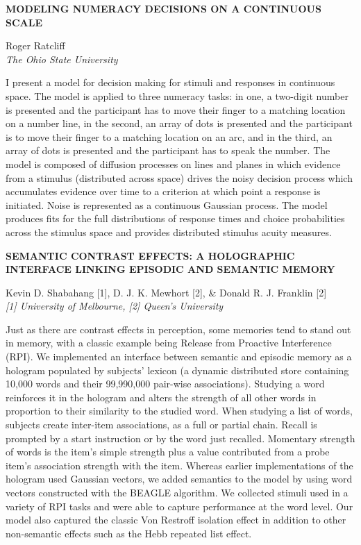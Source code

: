 \documentclass[]{article}
\begin{document}
\textbf{MODELING NUMERACY DECISIONS ON A CONTINUOUS SCALE}

Roger Ratcliff\\
\emph{The Ohio State University}

I present a model for decision making for stimuli and responses in
continuous space. The model is applied to three numeracy tasks: in one,
a two-digit number is presented and the participant has to move their
finger to a matching location on a number line, in the second, an array
of dots is presented and the participant is to move their finger to a
matching location on an arc, and in the third, an array of dots is
presented and the participant has to speak the number. The model is
composed of diffusion processes on lines and planes in which evidence
from a stimulus (distributed across space) drives the noisy decision
process which accumulates evidence over time to a criterion at which
point a response is initiated. Noise is represented as a continuous
Gaussian process. The model produces fits for the full distributions of
response times and choice probabilities across the stimulus space and
provides distributed stimulus acuity measures.\\
\pagebreak  

\textbf{SEMANTIC CONTRAST EFFECTS: A HOLOGRAPHIC INTERFACE LINKING
EPISODIC AND SEMANTIC MEMORY}

Kevin D. Shabahang {[}1{]}, D. J. K. Mewhort {[}2{]}, \& Donald R. J.
Franklin {[}2{]}\\
\emph{{[}1{]} University of Melbourne, {[}2{]} Queen's University}

Just as there are contrast effects in perception, some memories tend to
stand out in memory, with a classic example being Release from Proactive
Interference (RPI). We implemented an interface between semantic and
episodic memory as a hologram populated by subjects' lexicon (a dynamic
distributed store containing 10,000 words and their 99,990,000 pair-wise
associations). Studying a word reinforces it in the hologram and alters
the strength of all other words in proportion to their similarity to the
studied word. When studying a list of words, subjects create inter-item
associations, as a full or partial chain. Recall is prompted by a start
instruction or by the word just recalled. Momentary strength of words is
the item's simple strength plus a value contributed from a probe item's
association strength with the item. Whereas earlier implementations of
the hologram used Gaussian vectors, we added semantics to the model by
using word vectors constructed with the BEAGLE algorithm. We collected
stimuli used in a variety of RPI tasks and were able to capture
performance at the word level. Our model also captured the classic Von
Restroff isolation effect in addition to other non-semantic effects such
as the Hebb repeated list effect.\\
\pagebreak  
\end{document}
